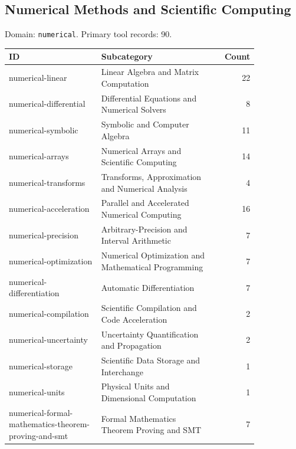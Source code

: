 \subsection{Numerical Methods and Scientific Computing}
\noindent Domain: \texttt{numerical}. Primary tool records: 90.
\begin{longtable}{p{0.37\linewidth}p{0.47\linewidth}r}
ID & Subcategory & Count\\\hline\endhead
numerical-linear & Linear Algebra and Matrix Computation & 22\\
numerical-differential & Differential Equations and Numerical Solvers & 8\\
numerical-symbolic & Symbolic and Computer Algebra & 11\\
numerical-arrays & Numerical Arrays and Scientific Computing & 14\\
numerical-transforms & Transforms, Approximation and Numerical Analysis & 4\\
numerical-acceleration & Parallel and Accelerated Numerical Computing & 16\\
numerical-precision & Arbitrary-Precision and Interval Arithmetic & 7\\
numerical-optimization & Numerical Optimization and Mathematical Programming & 7\\
numerical-differentiation & Automatic Differentiation & 7\\
numerical-compilation & Scientific Compilation and Code Acceleration & 2\\
numerical-uncertainty & Uncertainty Quantification and Propagation & 2\\
numerical-storage & Scientific Data Storage and Interchange & 1\\
numerical-units & Physical Units and Dimensional Computation & 1\\
numerical-formal-mathematics-theorem-proving-and-smt & Formal Mathematics Theorem Proving and SMT & 7\\
\end{longtable}
